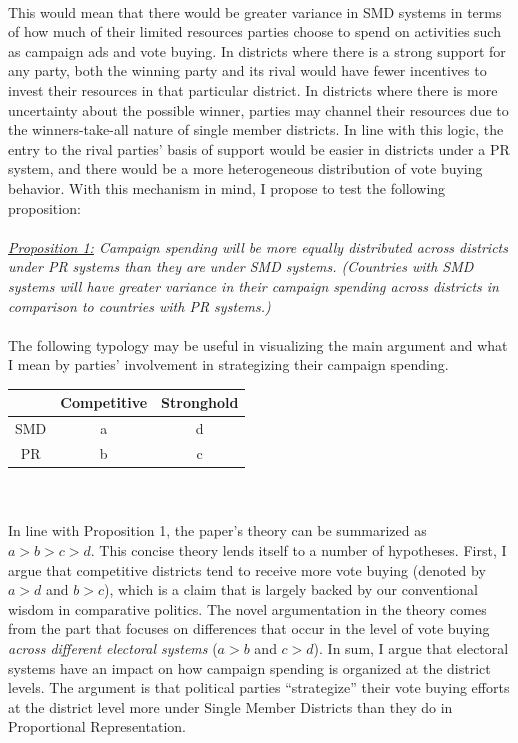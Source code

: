 \documentclass{article}
\begin{document}
\\
This would mean that there would be greater variance in SMD systems in terms of how much of their limited resources parties choose to spend on activities such as campaign ads and vote buying. In districts where there is a strong support for any party, both the winning party and its rival would have fewer incentives to invest their resources in that particular district. In districts where there is more uncertainty about the possible winner, parties may channel their resources due to the winners-take-all nature of single member districts. In line with this logic, the entry to the rival parties' basis of support would be easier in districts under a PR system, and there would be a more heterogeneous distribution of vote buying behavior. With this mechanism in mind, I propose to test the following proposition:\\
\\
\textit{\underline{Proposition 1:} Campaign spending will be more equally distributed across districts under PR systems than they are under SMD systems. (Countries with SMD systems will have greater variance in their campaign spending across districts in comparison to countries with PR systems.)}\\
\\
The following typology may be useful in visualizing the main argument and what I mean by parties' involvement in strategizing their campaign spending.
\begin{center}
	\begin{tabular}{ |c|c|c| } 
		\hline
		 & Competitive & Stronghold \\ 
		\hline
		SMD & a & d \\ 
		\hline
		PR & b & c \\ 
		\hline
	\end{tabular}
\end{center}\\
\\
In line with Proposition 1, the paper's theory can be summarized as $a>b>c>d$. This concise theory lends itself to a number of hypotheses. First, I argue that competitive districts tend to receive more vote buying (denoted by $a>d$ and $b>c$), which is a claim that is largely backed by our conventional wisdom in comparative politics. The novel argumentation in the theory comes from the part that focuses on differences that occur in the level of vote buying \textit{across different electoral systems} ($a>b$ and $c>d$). In sum, I argue that electoral systems have an impact on how campaign spending is organized at the district levels. The argument is that political parties ``strategize'' their vote buying efforts at the district level more under Single Member Districts than they do in Proportional Representation. 
\end{document}
